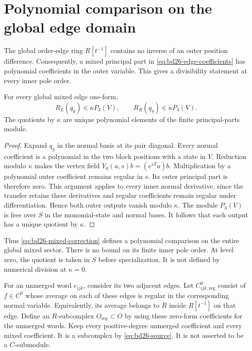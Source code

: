 \section{Polynomial comparison on the global edge domain}

The global order-edge ring $R[t^{-1}]$ contains no inverse of an outer position difference.
Consequently, a mixed principal part in \eqref{eq:bd26-edge-coefficients} has polynomial coefficients in the outer variable.
This gives a divisibility statement at every inner pole order.

\begin{lemma}\label{lem:bd26-global-divisibility}
For every global mixed edge one-form,
\[
 R_L(q_g)\in\kappa P_3(V),\qquad R_R(q_g)\in\kappa P_3(V).
\]
The quotients by $\kappa$ are unique polynomial elements of the finite principal-parts module.
\end{lemma}
\begin{proof}
Expand $q_g$ in the normal basis at its pair diagonal.
Every normal coefficient is a polynomial in the two block positions with a state in $V$.
Reduction modulo $\kappa$ makes the vertex field
$Y_0(a,s)b=(e^{sT}a)b$.
Multiplication by a polynomial outer coefficient remains regular in $s$.
Its outer principal part is therefore zero.
This argument applies to every inner normal derivative, since the transfer retains these derivatives and regular coefficients remain regular under differentiation.
Hence both outer outputs vanish modulo $\kappa$.
The module $P_3(V)$ is free over $S$ in the monomial-state and normal bases.
It follows that each output has a unique quotient by $\kappa$.
\end{proof}

Thus \eqref{eq:bd26-mixed-correction} defines a polynomial comparison on the entire global mixed sector.
There is no bound on its finite inner pole order.
At level zero, the quotient is taken in $S$ before specialization.
It is not defined by numerical division at $\kappa=0$.

For an unmerged word $e_{ijk}$, consider its two adjacent edges.
Let $C^0_{ijk,\mathrm{reg}}$ consist of $f\in C^0$ whose average on each of these edges is regular in the corresponding normal variable.
Equivalently, its average belongs to $R$ inside $R[t^{-1}]$ on that edge.
Define an $R$-subcomplex $O_{\mathrm{reg}}\subset O$ by using these zero-form coefficients for the unmerged words.
Keep every positive-degree unmerged coefficient and every mixed coefficient.
It is a subcomplex by \eqref{eq:bd26-source}.
It is not asserted to be a $C$-submodule.

